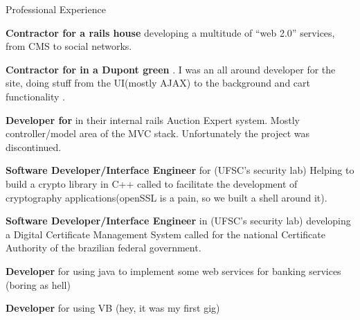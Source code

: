 \begin{rubric}{Professional Experience} 

    \entry*[2007 - 2008]%
        \textbf{Contractor for  a rails house} 
        developing a multitude of ``web 2.0'' services, from CMS to social networks.

    \entry*[2007]%
        \textbf{Contractor for  
        in a Dupont green }.
        I was an all around developer for the site, doing stuff from the
        UI(mostly AJAX) to the background and cart functionality .

    \entry*[2007]%
        \textbf{Developer for } 
        in their internal rails Auction Expert system. Mostly controller/model area of
        the MVC stack. Unfortunately the project was discontinued.

    \entry*[2005 - 2007]%
        \textbf{Software Developer/Interface Engineer} for 
        (UFSC's security lab) Helping
        to build a crypto library in C++ called  
        to facilitate the development of cryptography
        applications(openSSL is a pain, so we built a shell around it).

    \entry*[2005 - 2007]%
        \textbf{Software Developer/Interface Engineer} in 
        (UFSC's security lab) developing a
        Digital Certificate Management System  called
         for the national
        Certificate Authority of the brazilian federal government.

    \entry*[2004 - 2005]%
        \textbf{Developer} for  
        using java to implement some web services for banking services (boring as
        hell)

    \entry*[2003 - 2004]%
        \textbf{Developer} for  using VB 
        (hey, it was my first gig)

\end{rubric}
